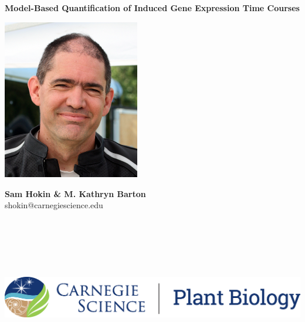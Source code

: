 \documentclass[aspb,landscape]{a0poster}
\begin{document}


{
  \color{CarnegiePriBlue} \VeryHuge
  \textbf{Model-Based Quantification of Induced Gene Expression Time Courses}    %
}
\vspace{5mm}

\begin{minipage}[m]{0.10\linewidth}
  \includegraphics[height=70mm]{sam-bfr-smiling-crop.jpg} %
\end{minipage}
\begin{minipage}[m]{0.40\linewidth}                      %
  \color{Black}
  \Huge \textbf{Sam Hokin \& M. Kathryn Barton} \\
  \Large shokin@carnegiescience.edu
\end{minipage}
\begin{minipage}[m]{0.50\linewidth}
  \includegraphics[height=70mm]{CS_plantbio_logo_horz.eps} %
\end{minipage}
\end{document}
